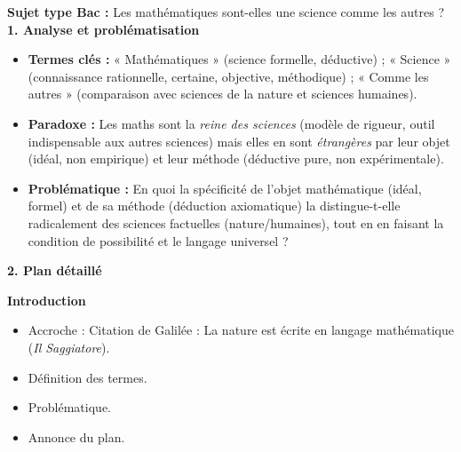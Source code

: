 \documentclass[11pt]{article}
\begin{document}
\begin{exoresolu}
    \textbf{Sujet type Bac :} \guillemotleft Les mathématiques sont-elles une science comme les autres ? \guillemotright
    \tcblower
    \textbf{1. Analyse et problématisation}
    \begin{itemize}
        \item \textbf{Termes clés :} « Mathématiques » (science formelle, déductive) ; « Science » (connaissance rationnelle, certaine, objective, méthodique) ; « Comme les autres » (comparaison avec sciences de la nature et sciences humaines).
        \item \textbf{Paradoxe :} Les maths sont la \emph{reine des sciences} (modèle de rigueur, outil indispensable aux autres sciences) mais elles en sont \emph{étrangères} par leur objet (idéal, non empirique) et leur méthode (déductive pure, non expérimentale).
        \item \textbf{Problématique :} En quoi la spécificité de l'objet mathématique (idéal, formel) et de sa méthode (déduction axiomatique) la distingue-t-elle radicalement des sciences factuelles (nature/humaines), tout en en faisant la condition de possibilité et le langage universel ?
    \end{itemize}

    \textbf{2. Plan détaillé}

    \textbf{Introduction}
    \begin{itemize}
        \item Accroche : Citation de Galilée : \guillemotleft La nature est écrite en langage mathématique \guillemotright (\emph{Il Saggiatore}).
        \item Définition des termes.
        \item Problématique.
        \item Annonce du plan.
    \end{itemize}


\end{exoresolu}
\end{document}
